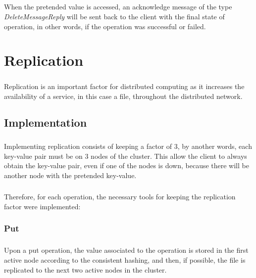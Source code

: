 \documentclass{report}
\begin{document}
					\paragraph{} When the pretended value is accessed, an acknowledge message of 
					the type \emph{DeleteMessageReply} will be sent back to the client with 
					the final state of operation, in other words, if the operation was 
					successful or failed.
	
	\chapter{Replication}
	
	        \paragraph{} Replication is an important factor for distributed computing
			as it increases the availability of a service, in this case a file,
			throughout the distributed network.
	        
			\section{Implementation}
	
				\paragraph{} Implementing replication consists of keeping a factor 
				of 3, by another words, each key-value pair must be on 3 nodes of 
				the cluster. This allow the client to always obtain the key-value 
				pair, even if one of the nodes is down, because there will be another
				node with the pretended key-value. 

				\paragraph{} Therefore, for each operation, the necessary tools for 
				keeping the replication factor were implemented:
				
				\subsection{Put}
					\paragraph{} Upon a put operation, the value associated to the
					operation is stored in the first active node according to the 
					consistent hashing, and then, if possible, the file is replicated to 
					the next two active nodes in the cluster.
\end{document}
